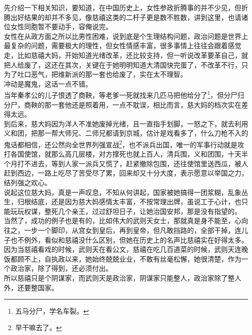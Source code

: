 \begin{multicols}{\theparacolNo}
先介绍一下相关知识，要知道，在中国历史上，女性参政折腾事的并不少见，但折腾出好结果的却并不多见，像慈禧这类的二杆子更是数不胜数，讲到这里，也请诸位女性同胞暂不要动手，容俺说完。\\

女性在从政方面之所以比男性困难，说到底是个生理结构问题，政治问题是世界上最复杂的问题，需要极大的理性，但女性情感丰富，很多事情上往往会跟着感觉走，比如慈禧大妈，开始知道光绪改革，还比较支持，但一听说改革要革自己，就把人给废了，这还在其次，关键在于她明明知道大清国快完蛋了，不改革不行，只为了吐口恶气，把维新派的那一套也给废了，实在太不理智。\\

冲动是魔鬼，这话一点不错。\\

当年秦孝公的儿子恨透了商鞅，等老爹一死就找来几匹马把他给分了\footnote{五马分尸，学名车裂。}，但分尸归分尸，商鞅的那一套他还是照着用，一点不耽误，相比而言，慈大妈的档次实在差得太远。\\

到后来，慈大妈因为洋人不准她废掉光绪，且一直指手划脚，一怒之下，就去利用义和团，把那一帮大师兄、二师兄都请到京城，估计是戏看多了，什么刀枪不入的鬼话都相信，还公然向全世界列强宣战\footnote{早干嘛去了。}，也不派兵出国，唯一的军事行动就是攻打各国使馆，就那么高几层楼，对方撑死也就上百人，清兵围，义和团围，十天半个月打不进去，等到人家一派兵又慌了，赶紧撤除包围，还往使馆里送西瓜，被人赶到西边，一路上吃尽了苦受尽了累，回来却又十分大度，表示愿意以举国之力，结列强之欢心。\\

说起这位慈大妈，真是一声叹息，不知从何讲起，国家被她搞得一团浆糊，乱象丛生，归根结底，还是因为慈大妈感情太丰富，不按常理出牌，虽说工于心计，也只能玩玩权谋，整死几个亲王，过过舒坦日子，让她治国安邦，那是没有指望的。\\

当然了，成功的例子也是有的，比如伟大的武则天女士，那就真是身不能至，心向往之，一步一个脚印，从宫女到皇后，再到皇帝，但凡敢挡路的，全部干掉，连儿子也不例外，看似和慈禧没什么区别，但她在历史上的名声比慈禧实在好得太多。\\

因为当慈禧看戏的时候，武则天在看公文，慈禧在吃几百道菜的时候，武则天连晚饭都顾不上，自执政以来，她始终兢兢业业，不敢有丝毫松懈，她很清楚，作为一个政治家，除了得到，还必须付出。\\

所以慈禧只是个阴谋家，而武则天是政治家，阴谋家只能整人，政治家除了整人外，还要整国家。\\


\end{multicols}
